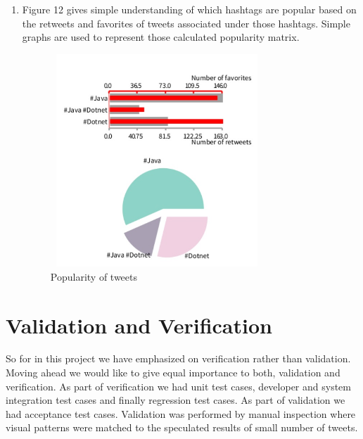 \documentclass[11pt]{article}
\begin{document}
\begin{enumerate}
\item Figure 12 gives simple understanding of which hashtags are popular based on the retweets and favorites of tweets associated under those hashtags. Simple graphs are used to represent those calculated popularity matrix.
\begin{figure}[h]
\centering
\includegraphics[width=8cm, height=8cm]{Graph.jpg}
\caption{Popularity of tweets}
\end{figure}


\end{enumerate}

\section{Validation and Verification}
So for in this project we have emphasized on verification rather than validation. Moving ahead we would like to give equal importance to both, validation and verification. As part of verification we had unit test cases, developer and system integration test cases and finally regression test cases. As part of validation we had acceptance test cases. Validation was performed by manual inspection where visual patterns were matched to the speculated results of small number of tweets.
\end{document}
